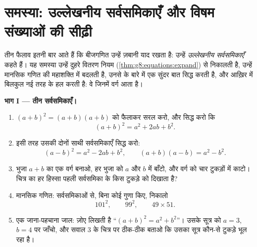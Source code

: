 \section{समस्या: उल्लेखनीय सर्वसमिकाएँ और विषम संख्याओं की
सीढ़ी}

\begin{problem}[{सप्ताहांत समस्या --- $(a+b)^2$, $(a-b)^2$,
$(a+b)(a-b)$, और योग $1 + 3 + 5 + \dots + (2n-1) = n^2$}]
\label{pb:g8:equations:1}
तीन फैलाव इतनी बार आते हैं कि बीजगणित उन्हें ज़बानी याद रखता है:
उन्हें \emph{उल्लेखनीय सर्वसमिकाएँ} कहते हैं। यह समस्या उन्हें दुहरे
वितरण नियम (\cref{thm:g8:equations:expand}) से निकालती है, उन्हें
मानसिक गणित की महाशक्ति में बदलती है, उनसे  के बारे में
एक सुंदर बात सिद्ध करती है, और आख़िर में बिलकुल नई तरह के  हल
करती है: वे  जिनमें वर्ग आता है।

\medskip
\noindent\textbf{भाग I --- तीन सर्वसमिकाएँ।}
\begin{enumerate}
  \item $(a + b)^2 = (a + b)(a + b)$ को फैलाकर सरल करो, और सिद्ध
        करो कि
        \[
        (a + b)^2 = a^2 + 2ab + b^2 .
        \]
  \item इसी तरह उसकी दोनों साथी सर्वसमिकाएँ सिद्ध करो:
        \[
        (a - b)^2 = a^2 - 2ab + b^2,
        \qquad
        (a + b)(a - b) = a^2 - b^2 .
        \]
  \item भुजा $a + b$ का एक वर्ग बनाओ, हर भुजा को $a$ और $b$ में
        बाँटो, और वर्ग को चार टुकड़ों में काटो। चित्र का हर हिस्सा
        पहली सर्वसमिका के किस टुकड़े को दिखाता है?
  \item मानसिक गणित: सर्वसमिकाओं से, बिना कोई गुणा किए, निकालो
        \[
        101^2, \qquad 99^2, \qquad 49 \times 51 .
        \]
  \item एक जाना-पहचाना जाल: ज़ोए लिखती है
        ``$(a + b)^2 = a^2 + b^2$''। उसके सूत्र को $a = 3$,
        $b = 4$ पर जाँचो, और सवाल 3 के चित्र पर ठीक-ठीक बताओ कि
        उसका सूत्र कौन-से टुकड़े भूल रहा है।
\end{enumerate}


\end{problem}
